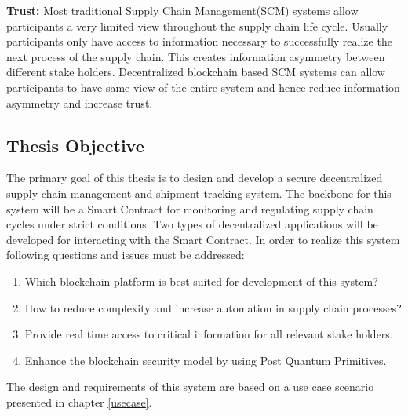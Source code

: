 \textbf{Trust:}
Most traditional Supply Chain Management(SCM) systems allow participants a very limited view throughout the supply chain life cycle. Usually participants only have access to information necessary to successfully realize the next process of the supply chain. This creates information asymmetry between different stake holders. Decentralized blockchain based SCM systems can allow participants to have same view of the entire system and hence reduce information asymmetry and increase trust.
\clearpage

\subsection{Thesis Objective}
The primary goal of this thesis is to design and develop a secure decentralized supply chain management and shipment tracking system. The backbone for this system will be a Smart Contract for monitoring and regulating supply chain cycles under strict conditions. Two types of decentralized applications will be developed for interacting with the Smart Contract. In order to realize this system following questions and issues must be addressed:

\begin{enumerate}[label=(\alph*)]
\item Which blockchain platform is best suited for development of this system? 
\item How to reduce complexity and increase automation in supply chain processes?
\item Provide real time access to critical information for all relevant stake holders.
\item Enhance the blockchain security model by using Post Quantum Primitives.
\end{enumerate}

The design and requirements of this system are based on a use case scenario presented in chapter \ref{usecase}. 

